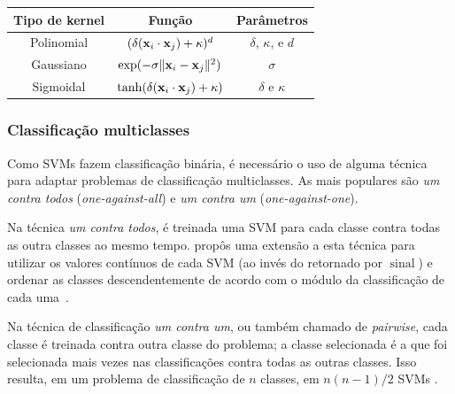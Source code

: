 \begin{table}
\centering
\begin{tabular}{|c|c|c|}
\hline
Tipo de kernel & Função & Parâmetros \\
\hline
Polinomial & $(\delta(\mathbf{x}_i\cdot\mathbf{x}_j)+\kappa)^d$ & $\delta$, $\kappa$, e $d$ \\
Gaussiano & $\exp(-\sigma\lVert \mathbf{x}_i-\mathbf{x}_j \rVert^2)$ & $\sigma$ \\
Sigmoidal & $\tanh(\delta(\mathbf{x}_i\cdot\mathbf{x}_j)+\kappa)$ & $\delta$ e $\kappa$ \\
\hline
\end{tabular}
\label{quadro:kernels}
\end{table}

\subsubsection{Classificação multiclasses}\label{sec:svmmulti}


Como SVMs fazem classificação binária, é necessário o uso de alguma técnica para adaptar problemas de classificação multiclasses. As mais populares são \emph{um contra todos} (\emph{one-against-all}) e \emph{um contra um} (\emph{one-against-one}).

Na técnica \emph{um contra todos}, é treinada uma SVM para cada classe contra todas as outra classes ao mesmo tempo.  propôs uma extensão a esta técnica para utilizar os valores contínuos de cada SVM (ao invés do retornado por $\operatorname{sinal}$) e ordenar as classes descendentemente de acordo com o módulo da classificação de cada uma~\cite{abe2003analysis}.

Na técnica de classificação \emph{um contra um}, ou também chamado de \emph{pairwise}, cada classe é treinada contra outra classe do problema; a classe selecionada é a que foi selecionada mais vezes nas classificações contra todas as outras classes. Isso resulta, em um problema de classificação de $n$ classes, em $n(n - 1)/2$ SVMs \cite{kressel1999pairwise}.




